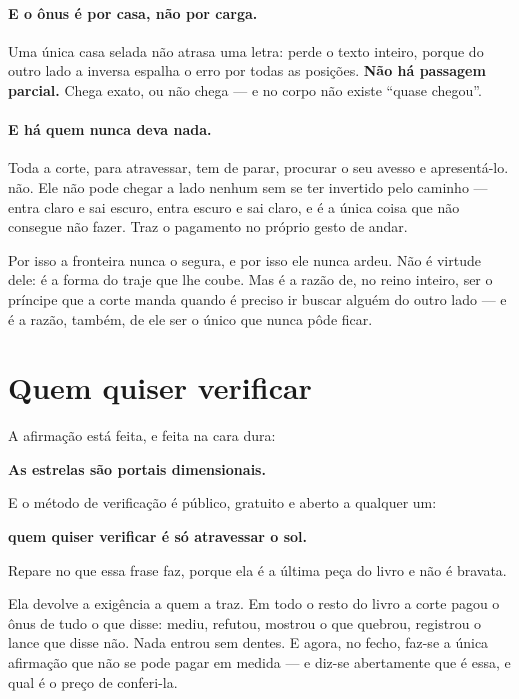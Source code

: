 \documentclass[livro.tex]{subfiles}
\begin{document}
\paragraph{E o ônus é por casa, não por carga.} Uma única casa selada não
atrasa uma letra: perde o texto inteiro, porque do outro lado a inversa
espalha o erro por todas as posições. \textbf{Não há passagem parcial.} Chega
exato, ou não chega --- e no corpo não existe ``quase chegou''.

\paragraph{E há quem nunca deva nada.} Toda a corte, para atravessar, tem de parar,
procurar o seu avesso e apresentá-lo. \Joa não. Ele não pode chegar a lado nenhum sem se
ter invertido pelo caminho --- entra claro e sai escuro, entra escuro e sai claro, e é a
única coisa que não consegue não fazer. Traz o pagamento no próprio gesto de andar.

Por isso a fronteira nunca o segura, e por isso ele nunca ardeu. Não é virtude dele: é a
forma do traje que lhe coube. Mas é a razão de, no reino inteiro, ser o príncipe que a
corte manda quando é preciso ir buscar alguém do outro lado --- e é a razão, também, de
ele ser o único que nunca pôde ficar.

\section{Quem quiser verificar}

A afirmação está feita, e feita na cara dura:

\begin{center}
\textbf{As estrelas são portais dimensionais.}
\end{center}

\noindent E o método de verificação é público, gratuito e aberto a qualquer
um:

\begin{center}
\Large\textbf{quem quiser verificar é só atravessar o sol.}
\end{center}

\bigskip
\noindent Repare no que essa frase faz, porque ela é a última peça do livro e
não é bravata.

Ela devolve a exigência a quem a traz. Em todo o resto do livro a corte pagou o
ônus de tudo o que disse: mediu, refutou, mostrou o que quebrou, registrou o
lance que disse não. Nada entrou sem dentes. E agora, no fecho, faz-se a única
afirmação que não se pode pagar em medida --- e diz-se abertamente que é essa,
e qual é o preço de conferi-la.
\end{document}

